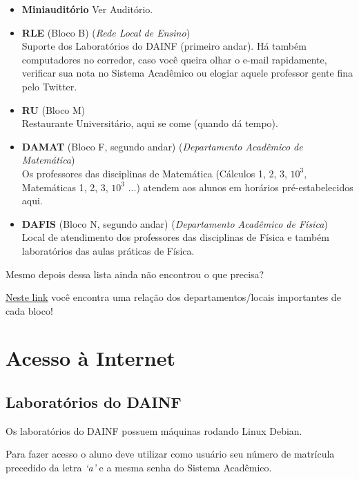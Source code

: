 \documentclass[a4paper,12pt,openany]{article}
\begin{document}
\begin{itemize}
\item \textbf{Miniauditório} Ver Auditório.

\item \textbf{RLE} (Bloco B) (\textit{Rede Local de Ensino}) \\Suporte dos Laboratórios do DAINF (primeiro andar). Há também computadores no corredor, caso você queira olhar o e-mail rapidamente, verificar sua nota no Sistema Acadêmico ou elogiar aquele professor gente fina pelo Twitter.

\item \textbf{RU} (Bloco M)\\ Restaurante Universitário, aqui se come (quando dá tempo).

\item \textbf{DAMAT} (Bloco F, segundo andar) (\textit{Departamento Acadêmico de Matemática})\\ Os professores das disciplinas de Matemática (Cálculos 1, 2, 3, $10^3$, Matemáticas 1, 2, 3, $10^3$ ...) atendem aos alunos em horários pré-estabelecidos aqui.

\item \textbf{DAFIS} (Bloco N, segundo andar) (\textit{Departamento Acadêmico de Física})\\  Local de atendimento dos professores das disciplinas de Física e também laboratórios das aulas práticas de Física.

\end{itemize}

Mesmo depois dessa lista ainda não encontrou o que precisa? 

\href{http://200.134.25.110/mapa/mapa.html}{Neste link} você encontra uma relação dos departamentos/locais importantes de cada bloco!


\newpage
\section{Acesso à Internet}

\subsection{Laboratórios do DAINF}

Os laboratórios do DAINF possuem máquinas rodando Linux Debian. 

Para fazer acesso o aluno deve utilizar como usuário seu número de matrícula precedido da letra \textit{‘a’} e a mesma senha do Sistema Acadêmico. 
\end{document}
